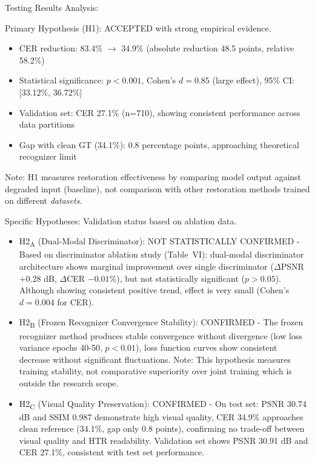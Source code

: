 \documentclass[journal]{IEEEtran}
\begin{document}
Testing Results Analysis:

Primary Hypothesis (H1): ACCEPTED with strong empirical evidence.
\begin{itemize}
\item CER reduction: 83.4\% $\rightarrow$ 34.9\% (absolute reduction 48.5 points, relative 58.2\%)
\item Statistical significance: $p<0.001$, Cohen's $d=0.85$ (large effect), 95\% CI: [33.12\%, 36.72\%]
\item Validation set: CER 27.1\% (n=710), showing consistent performance across data partitions
\item Gap with clean GT (34.1\%): 0.8 percentage points, approaching theoretical recognizer limit
\end{itemize}

Note: H1 measures restoration effectiveness by comparing model output against degraded input (baseline), not comparison with other restoration methods trained on different \textit{datasets}.

Specific Hypotheses: Validation status based on ablation data.
\begin{itemize}
\item H2\textsubscript{A} (Dual-Modal Discriminator): NOT STATISTICALLY CONFIRMED - Based on discriminator ablation study (Table~VI): dual-modal discriminator architecture shows marginal improvement over single discriminator ($\Delta$PSNR +0.28 dB, $\Delta$CER $-0.01$\%), but not statistically significant ($p>0.05$). Although showing consistent positive trend, effect is very small (Cohen's $d=0.004$ for CER).

\item H2\textsubscript{B} (Frozen Recognizer Convergence Stability): CONFIRMED - The frozen recognizer method produces stable convergence without divergence (low loss variance epochs 40-50, $p<0.01$), loss function curves show consistent decrease without significant fluctuations. Note: This hypothesis measures training stability, not comparative superiority over joint training which is outside the research scope.

\item H2\textsubscript{C} (Visual Quality Preservation): CONFIRMED - On test set: PSNR 30.74 dB and SSIM 0.987 demonstrate high visual quality, CER 34.9\% approaches clean reference (34.1\%, gap only 0.8 points), confirming no trade-off between visual quality and HTR readability. Validation set shows PSNR 30.91 dB and CER 27.1\%, consistent with test set performance.
\end{itemize}
\end{document}
